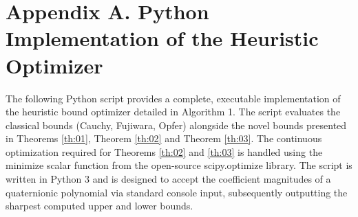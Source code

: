 \documentclass [12pt]{article}
\begin{document}
\section*{Appendix A. Python Implementation of the Heuristic Optimizer}
The following Python script provides a complete, executable implementation of the heuristic bound optimizer detailed in Algorithm 1. The script evaluates the classical bounds (Cauchy, Fujiwara, Opfer) alongside the novel bounds presented in Theorems \ref{th:01}, Theorem \ref{th:02} and Theorem \ref{th:03}. The continuous optimization required for Theorems \ref{th:02} and \ref{th:03} is handled using the minimize scalar function from the open-source scipy.optimize library. The script is written in Python 3 and is designed to accept the coefficient magnitudes of a quaternionic polynomial via standard console input, subsequently outputting the sharpest computed upper and lower bounds.
\end{document}
